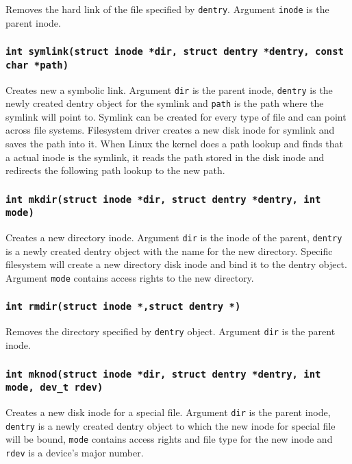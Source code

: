 Removes the hard link of the file specified by \texttt{dentry}. Argument
\texttt{inode} is the parent inode.

\subsubsection{\texttt{int symlink(struct inode *dir, struct dentry *dentry, const char
*path)}}

Creates new a symbolic link. Argument \texttt{dir} is the parent inode,
\texttt{dentry} is the newly
created dentry object for the symlink and \texttt{path} is the path where the symlink will
point to. Symlink can be created for every type of file and can point across file
systems. Filesystem driver creates a new disk inode for symlink and saves the path
into it. When Linux the kernel does a path lookup and finds that a actual inode is the symlink, it
reads the path stored in the disk inode and redirects the following path lookup to the new path.

\subsubsection{\texttt{int mkdir(struct inode *dir, struct dentry *dentry, int mode)}}

Creates a new directory inode. Argument \texttt{dir} is the inode of the parent,
\texttt{dentry} is a newly created dentry object with the name for the new directory. Specific
filesystem will create a new directory disk inode and bind it to the dentry object.
Argument \texttt{mode} contains access rights to the new directory.

\subsubsection{\texttt{int rmdir(struct inode *,struct dentry *)}}

Removes the directory specified by \texttt{dentry} object. Argument \texttt{dir} is 
the parent inode.

\subsubsection{\texttt{int mknod(struct inode *dir, struct dentry *dentry, int mode,
dev\_t rdev)}}

Creates a new disk inode for a special file. Argument \texttt{dir} is the parent inode,
\texttt{dentry} is a newly created dentry object to which the new inode for
special file will be bound, \texttt{mode} contains access rights and file type for the new
inode and \texttt{rdev} is a device's major number.

